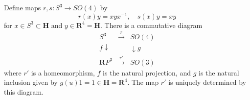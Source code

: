 Define maps $r, s: S^3 \to SO(4)$ by
$$r(x)y = xyx^{-1}, \quad s(x)y = xy$$
for $x \in S^3 \subset \mathbf{H}$ and $y \in \mathbf{R}^4 = \mathbf{H}$.
There is a commutative diagram
$$\begin{array}{ccc}
S^3 & \xrightarrow{r} & SO(4) \\
{\scriptstyle f}\downarrow & & \downarrow{\scriptstyle g} \\
\mathbf{R}P^3 & \xrightarrow{r'} & SO(3)
\end{array}$$
where $r'$ is a homeomorphism, $f$ is the natural projection, and $g$ is the natural inclusion given by $g(u)1 = 1 \in \mathbf{H} = \mathbf{R}^4$. The map $r'$ is uniquely determined by this diagram.
